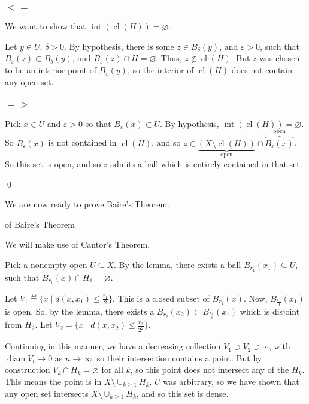 \documentclass[x11names,reqno,14pt]{extarticle}
\newcommand*{\oo}{{\infty}}
\DeclareMathOperator{\cl}{cl}
\begin{document}
\proof

\subsubsection*{\underline{$<=$}}

We want to show that $\operatorname{int}(\cl(H)) = \varnothing$.

Let $y \in U$, $\delta>0$. By hypothesis, there is some $z \in B_{\delta}(y)$, and $\varepsilon>0$, such that $B_{\varepsilon}(z) \subset B_{\delta}(y)$, and $B_{\varepsilon}(z) \cap H = \varnothing$. Thus, $z \not\in \cl(H)$. But $z$ was chosen to be an interior point of $B_{\varepsilon}(y)$, so the interior of $\cl(H)$ does not contain any open set. 

\subsubsection*{\underline{$=>$}}

Pick $x \in U$ and $\varepsilon > 0$ so that $B_{\varepsilon}(x) \subset U$. By hypothesis, $\operatorname{int}(\cl(H)) = \varnothing$. So $B_\varepsilon(x)$ is not contained in $\cl(H)$, and so $z \in \underbrace{(X \setminus \cl(H))}_{\text{open}} \cap \overbrace{B_{\varepsilon}(x)}^{\text{open}}$. So this set is open, and so $z$ admits a ball which is entirely contained in that set. 

\qed

We are now ready to prove Baire's Theorem. 

\proof of Baire's Theorem

We will make use of Cantor's Theorem.

Pick a nonempty open $U \subseteq X$. By the lemma, there exists a ball $B_{r_1}(x_1) \subseteq U$, such that $B_{r_1}(x) \cap H_1 = \varnothing$. 

Let $V_1 \eqdef \{x \mid d(x, x_1) \leq \frac{r_1}{2}\}$. This is a closed subset of $B_{r_1}(x)$. Now, $B_{\frac{r_1}{3}}(x_1)$ is open. So, by the lemma, there exists a $B_{r_2}(x_2) \subset B_{\frac{r_1}{3}}(x_1)$ which is disjoint from $H_2$. Let $V_2 = \{x \mid d(x, x_2) \leq \frac{r_2}{2^2}\}$. 

Continuing in this manner, we have a decreasing collection $V_1 \supset V_2 \supset \cdots $, with $\operatorname{diam}V_i \to 0$ as $n\to\oo$, so their intersection contains a point. But by construction $V_k \cap H_k = \varnothing$ for all $k$, so this point does not intersect any of the $H_k$. This means the point is in $X \setminus \cup_{k\geq1}H_k$. $U$ was arbitrary, so we have shown that any open set intersects $X \setminus \cup_{k\geq1}H_k$, and so this set is dense. 
\end{document}
